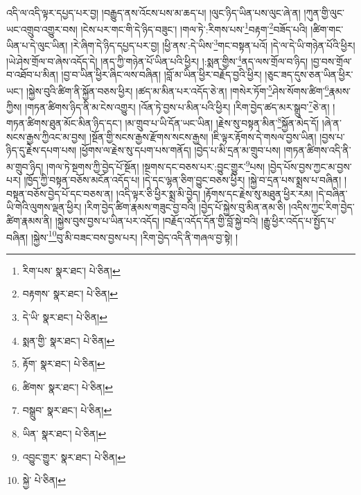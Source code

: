 འདི་ལ་འདི་ལྟར་དཔྱད་པར་བྱ། །བརྒྱུད་ནས་འོངས་པས་མ་ཆད་པ། །ལུང་ཉིད་ཡིན་པས་ལུང་ཞེ་ན། །ཀུན་གྱི་ལུང་ཡང་འགྲུབ་འགྱུར་བས། །ངེས་པར་གང་གི་དེ་ཉིད་བཟུང་། །གལ་ཏེ་:རིགས་པས་\footnote{རིག་པས་  སྣར་ཐང་།  པེ་ཅིན། }བརྟག་\footnote{བརྟགས་  སྣར་ཐང་།  པེ་ཅིན། }བཟོད་པའི། །ཚིག་གང་ཡིན་པ་དེ་ལུང་ཡིན། །རེ་ཞིག་དེ་ཉིད་དཔྱད་པར་བྱ། །ཕྱི་ནས་:དེ་ཡིས་\footnote{དེ་ཡི་  སྣར་ཐང་།  པེ་ཅིན། }གང་བསྟན་པའོ། །དེ་ལ་དེ་ཡི་གཉེན་པོའི་ཕྱིར། །ཡེ་ཤེས་གྲོལ་བ་ཞེས་འདོད་དེ། །ནད་ཀྱི་གཉེན་པོ་ཡིན་པའི་ཕྱིར། །:སྨན་གྱིས་\footnote{སྨན་གྱི་  སྣར་ཐང་།  པེ་ཅིན། }ནད་ལས་གྲོལ་བ་ཉིད། །བྱ་བས་གྲོལ་བ་འཐོབ་པ་མིན། །བྱ་བ་ཡིན་ཕྱིར་ཞིང་ལས་བཞིན། །བློ་མ་ཡིན་ཕྱིར་བརྗོད་བྱའི་ཕྱིར། །ཅུང་ཟད་དུས་ཅན་ཡིན་ཕྱིར་ཡང་། །སྐྱེས་བུའི་ཚིག་ནི་སྐྱོན་བཅས་ཕྱིར། །ཚད་མ་མིན་པར་འདོད་ཅེ་ན། །གསེར་ཏོག་\footnote{རྟོག་  སྣར་ཐང་།  པེ་ཅིན། }ཤེས་སོགས་ཚིག་\footnote{ཚིགས་  སྣར་ཐང་།  པེ་ཅིན། }རྣམས་ཀྱིས། །གཏན་ཚིགས་ཉིད་ནི་མ་ངེས་འགྱུར། །འོན་ཏེ་བྱས་པ་མིན་པའི་ཕྱིར། །རིག་བྱེད་ཚད་མར་སྒྲུབ་\footnote{བསྒྲུབ་  སྣར་ཐང་།  པེ་ཅིན། }ཅེ་ན། །གཏན་ཚིགས་ཐུན་མོང་མིན་ཉིད་དང་། །མ་གྲུབ་པ་ཡི་དོན་ཡང་ཡིན། །རྗེས་སུ་བསྟན་མིན་\footnote{ཡིན་  སྣར་ཐང་།  པེ་ཅིན། }སྐྱོན་མེད་དོ། །ཞེ་ན་སངས་རྒྱས་ཀྱིའང་མ་བྱས། །སྔོན་གྱི་སངས་རྒྱས་རྫོགས་སངས་རྒྱས། །ཇི་ལྟར་རྟོགས་དེ་གསལ་བྱས་ཡིན། །བྱས་པ་ཉིད་དུ་རྗེས་དཔག་པས། །ཕྱོགས་ལ་རྗེས་སུ་དཔག་པས་གནོད། །བྱེད་པ་མི་དྲན་མ་གྲུབ་པས། །གཏན་ཚིགས་འདི་ནི་མ་གྲུབ་ཉིད། །གལ་ཏེ་སྔགས་ཀྱི་བྱེད་པོ་སྔོན། །སྔགས་དང་བཅས་པར་:བྱུང་གྱུར་\footnote{འབྱུང་གྱུར་  སྣར་ཐང་།  པེ་ཅིན། }པས། །བྱེད་པོས་བྱས་ཀྱང་མ་བྱས་པར། །ཁྱོད་ཀྱི་བསྟན་བཅོས་མངོན་འདོད་པ། །དེ་དང་ལྷན་ཅིག་བྱུང་བཅས་ཕྱིར། །སྐྱེ་བ་དྲན་པས་སྨྲས་པ་བཞིན། །བསྟན་བཅོས་བྱེད་པོ་དང་བཅས་ན། །འདི་ལྟར་ཅི་ཕྱིར་སྨྲ་མི་བྱེད། །རྟོགས་དང་རྗེས་སུ་མཐུན་ཕྱིར་རམ། །དེ་བཞིན་ཡི་གེའི་ལུགས་ལྡན་ཕྱིར། །རིག་བྱེད་ཚིག་རྣམས་གཟུང་བྱ་བའི། །བྱེད་པོ་སྐྱེས་བུ་མིན་ནམ་ཅི། །འདིས་ཀྱང་རིག་བྱེད་ཚིག་རྣམས་ནི། །སྐྱེས་བུས་བྱས་པ་ཡིན་པར་འདོད། །བརྗོད་འདོད་དོན་གྱི་བློ་སྐྱེ་བའི། །རྒྱུ་ཕྱིར་འདོད་པ་སྤྱོད་པ་བཞིན། །སྐྱེས་\footnote{སྐྱེ་  པེ་ཅིན། }བུ་མི་བཟང་བས་བྱས་པར། །རིག་བྱེད་འདི་ནི་གཞལ་བྱ་སྟེ། །
